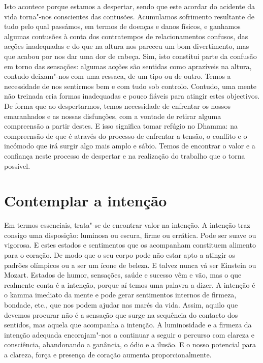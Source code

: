 Isto acontece porque estamos a despertar, sendo que este acordar do acidente da vida torna"-nos conscientes das contusões. Acumulamos sofrimento resultante de tudo pelo qual passámos, em termos de doenças e danos físicos, e ganhamos algumas contusões à conta dos contratempos de relacionamentos confusos, das acções inadequadas e do que na altura nos pareceu um bom divertimento, mas que acabou por nos dar uma dor de cabeça. Sim, isto constitui parte da confusão em torno das sensações: algumas acções são sentidas como aprazíveis na altura, contudo deixam"-nos com uma ressaca, de um tipo ou de outro. Temos a necessidade de nos sentirmos bem e com tudo sob controlo. Contudo, uma mente não treinada cria formas inadequadas e pouco fiáveis para atingir estes objectivos. De forma que ao despertarmos, temos necessidade de enfrentar os nossos emaranhados e as nossas disfunções, com a vontade de retirar alguma compreensão a partir destes. E isso significa tomar refúgio no Dhamma: na compreensão de que é através do processo de enfrentar a tensão, o conflito e o incómodo que irá surgir algo mais amplo e sábio. Temos de encontrar o valor e a confiança neste processo de despertar e na realização do trabalho que o torna possível.

\section{Contemplar a intenção}

Em termos essenciais, trata"-se de encontrar valor na intenção. A intenção traz consigo uma disposição: luminosa ou escura, firme ou errática. Pode ser suave ou vigorosa. E estes estados e sentimentos que os acompanham constituem alimento para o coração. De modo que o seu corpo pode não estar apto a atingir os padrões olímpicos ou a ser um ícone de beleza. E talvez nunca vá ser Einstein ou Mozart. Estados de humor, sensações, saúde e sucesso vêm e vão, mas o que realmente conta é a intenção, porque aí temos uma palavra a dizer. A intenção é o kamma imediato da mente e pode gerar sentimentos internos de firmeza, bondade, etc., que nos podem ajudar nas marés da vida. Assim, aquilo que devemos procurar não é a sensação que surge na sequência do contacto dos sentidos, mas aquela que acompanha a intenção. A luminosidade e a firmeza da intenção adequada encorajam"-nos a continuar a seguir o percurso com clareza e consciência, abandonando a ganância, o ódio e a ilusão. E o nosso potencial para a clareza, força e presença de coração aumenta proporcionalmente.

